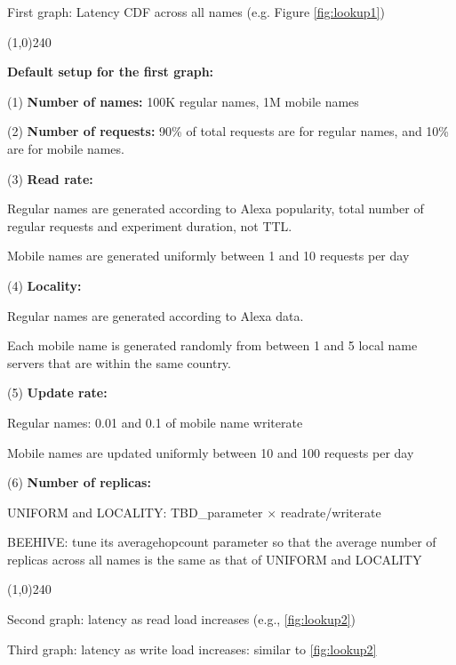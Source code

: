 First graph: Latency CDF across all names (e.g. Figure \ref{fig:lookup1})

\begin{center}
\line(1,0){240}
\end{center}

{\bf Default setup for the first graph:}

(1) {\bf Number of names:} 
100K regular names, 1M mobile names

(2) {\bf Number of requests:} 
90\% of total requests are for regular names, and 10\% are for mobile names.

(3) {\bf Read rate:}  

Regular names are generated according to Alexa popularity, total number of regular requests and experiment duration, not TTL.

Mobile names are generated uniformly between 1 and 10 requests per day

(4) {\bf Locality:} 

Regular names are generated according to Alexa data.

Each mobile name is generated randomly from between 1 and 5 local name servers that are within the same country.

(5) {\bf Update rate:}

Regular names: 0.01 and 0.1 of mobile name writerate

Mobile names are updated uniformly between 10 and 100 requests per day

(6) {\bf Number of replicas:}

UNIFORM and LOCALITY: TBD\_parameter $\times$ readrate/writerate

BEEHIVE: tune its averagehopcount parameter so that the average number of replicas across all names is the same as that of UNIFORM and LOCALITY

\begin{center}
\line(1,0){240}
\end{center}

Second graph: latency as read load increases (e.g., \ref{fig:lookup2})

Third graph: latency as write load increases: similar to \ref{fig:lookup2}


